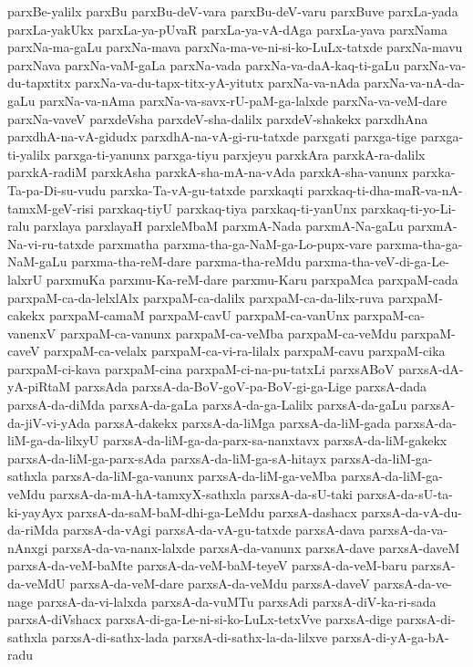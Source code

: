 {parxBe-yalilx
parxBu
parxBu-deV-vara
parxBu-deV-varu
parxBuve
parxLa-yada
parxLa-yakUkx
parxLa-ya-pUvaR
parxLa-ya-vA-dAga
parxLa-yava
parxNama
parxNa-ma-gaLu
parxNa-mava
parxNa-ma-ve-ni-si-ko-LuLx-tatxde
parxNa-mavu
parxNava
parxNa-vaM-gaLa
parxNa-vada
parxNa-va-daA-kaq-ti-gaLu
parxNa-va-du-tapxtitx
parxNa-va-du-tapx-titx-yA-yitutx
parxNa-va-nAda
parxNa-va-nA-da-gaLu
parxNa-va-nAma
parxNa-va-savx-rU-paM-ga-lalxde
parxNa-va-veM-dare
parxNa-vaveV
parxdeVsha
parxdeV-sha-dalilx
parxdeV-shakekx
parxdhAna
parxdhA-na-vA-gidudx
parxdhA-na-vA-gi-ru-tatxde
parxgati
parxga-tige
parxga-ti-yalilx
parxga-ti-yanunx
parxga-tiyu
parxjeyu
parxkAra
parxkA-ra-dalilx
parxkA-radiM
parxkAsha
parxkA-sha-mA-na-vAda
parxkA-sha-vanunx
parxka-Ta-pa-Di-su-vudu
parxka-Ta-vA-gu-tatxde
parxkaqti
parxkaq-ti-dha-maR-va-nA-tamxM-geV-risi
parxkaq-tiyU
parxkaq-tiya
parxkaq-ti-yanUnx
parxkaq-ti-yo-Li-ralu
parxlaya
parxlayaH
parxleMbaM
parxmA-Nada
parxmA-Na-gaLu
parxmA-Na-vi-ru-tatxde
parxmatha
parxma-tha-ga-NaM-ga-Lo-pupx-vare
parxma-tha-ga-NaM-gaLu
parxma-tha-reM-dare
parxma-tha-reMdu
parxma-tha-veV-di-ga-Le-lalxrU
parxmuKa
parxmu-Ka-reM-dare
parxmu-Karu
parxpaMca
parxpaM-cada
parxpaM-ca-da-lelxlAlx
parxpaM-ca-dalilx
parxpaM-ca-da-lilx-ruva
parxpaM-cakekx
parxpaM-camaM
parxpaM-cavU
parxpaM-ca-vanUnx
parxpaM-ca-vanenxV
parxpaM-ca-vanunx
parxpaM-ca-veMba
parxpaM-ca-veMdu
parxpaM-caveV
parxpaM-ca-velalx
parxpaM-ca-vi-ra-lilalx
parxpaM-cavu
parxpaM-cika
parxpaM-ci-kava
parxpaM-cina
parxpaM-ci-na-pu-tatxLi
parxsABoV
parxsA-dA-yA-piRtaM
parxsAda
parxsA-da-BoV-goV-pa-BoV-gi-ga-Lige
parxsA-dada
parxsA-da-diMda
parxsA-da-gaLa
parxsA-da-ga-Lalilx
parxsA-da-gaLu
parxsA-da-jiV-vi-yAda
parxsA-dakekx
parxsA-da-liMga
parxsA-da-liM-gada
parxsA-da-liM-ga-da-lilxyU
parxsA-da-liM-ga-da-parx-sa-nanxtavx
parxsA-da-liM-gakekx
parxsA-da-liM-ga-parx-sAda
parxsA-da-liM-ga-sA-hitayx
parxsA-da-liM-ga-sathxla
parxsA-da-liM-ga-vanunx
parxsA-da-liM-ga-veMba
parxsA-da-liM-ga-veMdu
parxsA-da-mA-hA-tamxyX-sathxla
parxsA-da-sU-taki
parxsA-da-sU-ta-ki-yayAyx
parxsA-da-saM-baM-dhi-ga-LeMdu
parxsA-dashacx
parxsA-da-vA-du-da-riMda
parxsA-da-vAgi
parxsA-da-vA-gu-tatxde
parxsA-dava
parxsA-da-va-nAnxgi
parxsA-da-va-nanx-lalxde
parxsA-da-vanunx
parxsA-dave
parxsA-daveM
parxsA-da-veM-baMte
parxsA-da-veM-baM-teyeV
parxsA-da-veM-baru
parxsA-da-veMdU
parxsA-da-veM-dare
parxsA-da-veMdu
parxsA-daveV
parxsA-da-ve-nage
parxsA-da-vi-lalxda
parxsA-da-vuMTu
parxsAdi
parxsA-diV-ka-ri-sada
parxsA-diVshacx
parxsA-di-ga-Le-ni-si-ko-LuLx-tetxVve
parxsA-dige
parxsA-di-sathxla
parxsA-di-sathx-lada
parxsA-di-sathx-la-da-lilxve
parxsA-di-yA-ga-bA-radu
}
